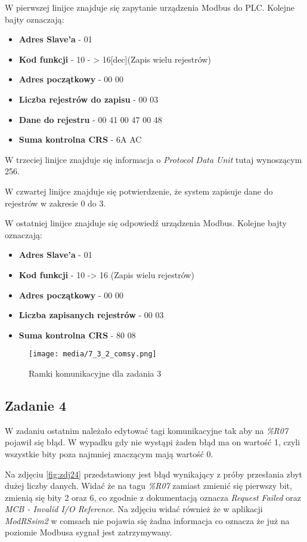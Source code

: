 \documentclass{article}
\begin{document}
W pierwszej linijce znajduje się zapytanie urządzenia Modbus do PLC. Kolejne bajty oznaczają:
\begin{itemize}
    \item \textbf{Adres Slave'a} - 01
    \item \textbf{Kod funkcji} - 10 - > 16[dec](Zapis wielu rejestrów)
    \item \textbf{Adres początkowy} - 00 00
    \item \textbf{Liczba rejestrów do zapisu} - 00 03
    \item \textbf{Dane do rejestru} - 00 41 00 47 00 48
    \item \textbf{Suma kontrolna CRS} - 6A AC
\end{itemize}

W trzeciej linijce znajduje się informacja o \textit{Protocol Data Unit} tutaj wynoszącym 256.

W czwartej linijce znajduje się potwierdzenie, że system zapisuje dane do rejestrów w zakresie 0 do 3.

W ostatniej linijce znajduje się odpowiedź urządzenia Modbus. Kolejne bajty oznaczają:
\begin{itemize}
    \item \textbf{Adres Slave'a} - 01
    \item \textbf{Kod funkcji} - 10 -> 16 (Zapis wielu rejestrów)
    \item \textbf{Adres początkowy} - 00 00
    \item \textbf{Liczba zapisanych rejestrów} - 00 03
    \item \textbf{Suma kontrolna CRS} - 80 08
\end{itemize}



\begin{figure}[H]
    \centering
    \texttt{[image: media/7\_3\_2\_comsy.png]}
    \caption{Ramki komunikacyjne dla zadania 3}
    \label{fig:zdj22}
\end{figure}

\newpage
\subsection{Zadanie 4}
W zadaniu ostatnim należało edytować tagi komunikacyjne tak aby na \textit{\%R07} pojawił się błąd. W wypadku gdy nie wystąpi żaden błąd ma on wartość 1, czyli wszystkie bity poza najmniej znaczącym mają wartość 0.

Na zdjęciu \ref{fig:zdj24} przedstawiony jest błąd wynikający z próby przesłania zbyt dużej liczby danych. Widać że na tagu \textit{\%R07} zamiast zmienić się pierwszy bit, zmienią się bity 2 oraz 6, co zgodnie z dokumentacją oznacza \textit{Request Failed} oraz \textit{MCB - Invalid I/O Reference}. Na zdjęciu widać również że w aplikacji \textit{ModRSsim2} w comsach nie pojawia się żadna informacja co oznacza że już na poziomie Modbusa sygnał jest zatrzymywany.
\end{document}
